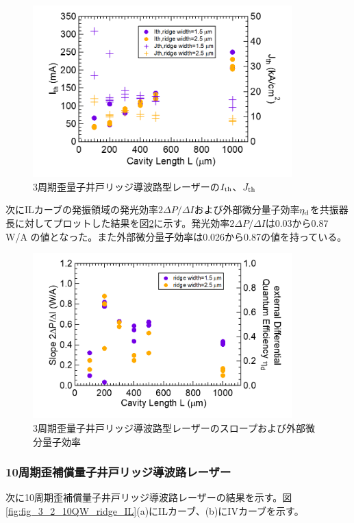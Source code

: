 {{\begin{figure}[h]
	\centering
	\includegraphics[width=10cm]{figure/fig_3_2_3QW_ridge_Ith.png}
		\caption{3周期歪量子井戸リッジ導波路型レーザーの$I_{\rm{th}}$、$J_{\rm{th}}$}
		\label{fig:fig_3_2_3QW_ridge_Ith}
\end{figure}
次にILカーブの発振領域の発光効率$2 \Delta P/\Delta I$および外部微分量子効率$\eta_{\rm{d}}$を共振器長に対してプロットした結果を図\ref{fig:fig_3_2_3QW_ridge_slope}に示す。発光効率$2 \Delta P/\Delta I$は0.03から0.87 W/A の値となった。また外部微分量子効率は0.026から0.87の値を持っている。
\begin{figure}[h]
	\centering
	\includegraphics[width=10cm]{figure/fig_3_2_3QW_ridge_slope.png}
		\caption{3周期歪量子井戸リッジ導波路型レーザーのスロープおよび外部微分量子効率}
		\label{fig:fig_3_2_3QW_ridge_slope}
\end{figure}

\clearpage
\subsubsection{10周期歪補償量子井戸リッジ導波路レーザー}
次に10周期歪補償量子井戸リッジ導波路レーザーの結果を示す。図\ref{fig:fig_3_2_10QW_ridge_IL}(a)にILカーブ、(b)にIVカーブを示す。

}}
